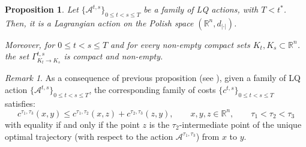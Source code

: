 \documentclass[reqno]{amsart}
\theoremstyle{plain}
\newtheorem{prop}[thm]{Proposition}
\theoremstyle{definition}
\theoremstyle{remark}
\newtheorem{rem}[thm]{Remark}
\begin{document}
	\begin{prop}\label{properties_LQ_action}
		Let $\{\mathcal{A}^{t,s}\}_{0\leq t<s \leq T}$ be a family of LQ actions, with $T<t^*$. Then, it is a Lagrangian action on the Polish space $(\mathbb{R}^n,d_{|\cdot|})$.
        
		Moreover, for $0\leq t<s \leq T$ and for every non-empty compact sets $K_t,K_s\subset\mathbb{R}^n$. the set $\Gamma^{t,s}_{K_t\to K_s}$ is compact and non-empty.
	\end{prop}
        \begin{rem}\label{rem_subadditivity_costs}
        As a consequence of previous proposition (see \cite[Proposition 7.16]{Villanioldandnew}), given a family of LQ action $\{\mathcal{A}^{t,s}\}_{0\leq t <s \leq T}$, the corresponding family of costs $\{c^{t,s}\}_{0\leq t <s \leq T}$ satisfies:
        \begin{equation}
				c^{\tau_1,\tau_3}(x,y)\leq c^{\tau_1,\tau_2}(x,z)+c^{\tau_2,\tau_3}(z,y),\qquad x,y,z\in\mathbb{R}^n,\qquad \tau_1<\tau_2<\tau_3
			\end{equation}
            with equality if and only if the point $z$ is the $\tau_2$-intermediate point of the unique optimal trajectory (with respect to the action $\mathcal{A}^{\tau_1,\tau_3}$) from $x$ to $y$.
        \end{rem}
\end{document}
